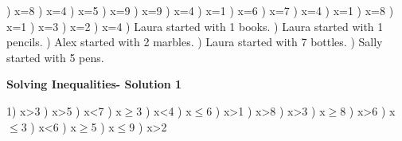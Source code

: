 \documentclass{article}%
\begin{document}
) x=8%
) x=4%
) x=5%
) x=9%
) x=9%
) x=4%
) x=1%
) x=6%
) x=7%
) x=4%
) x=1%
) x=8%
) x=1%
) x=3%
) x=2%
) x=4%
) Laura started with 1 books.%
) Laura started with 1 pencils.%
) Alex started with 2 marbles.%
) Laura started with 7 bottles.%
) Sally started with 5 pens.%
\newline%
\newpage%
\large%
\begin{center}%
\textbf{Solving Inequalities- Solution 1}%
\newline%
\end{center} \normalsize%
1) x>3%
) x>5%
) x<7%
) x$\geq$3%
) x<4%
) x$\leq$6%
) x>1%
) x>8%
) x>3%
) x$\geq$8%
) x>6%
) x$\leq$3%
) x<6%
) x$\geq$5%
) x$\leq$9%
) x>2%
\newline%
\end{document}
